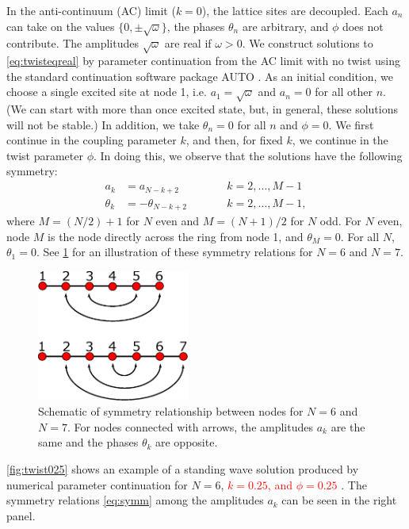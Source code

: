 \documentclass[reprint, amsmath,amssymb,aps,pra]{revtex4-2}
\def\noi{\noindent}
\renewcommand{\revised}[1]{ \textcolor{red}{#1} }
\begin{document}
In the anti-continuum (AC) limit ($k = 0$), the lattice sites are decoupled. Each $a_n$ can take on the values $\{0, \pm \sqrt{\omega} \}$, the phases $\theta_n$ are arbitrary, and $\phi$ does not contribute. The amplitudes $\sqrt{\omega}$ are real if  $\omega > 0$. We construct solutions to \cref{eq:twisteqreal} by parameter continuation from the AC limit with no twist using the standard continuation software package AUTO \revised{\cite{AUTO}}. As an initial condition, we choose a single excited site at node 1, i.e. $a_1 = \sqrt{\omega}$ and $a_n = 0$ for all other $n$. (We can start with more than once excited state, but, in general, these solutions will not be stable.) In addition, we take $\theta_n = 0$ for all $n$ and $\phi = 0$.  We first continue in the coupling parameter $k$, and then, for fixed $k$, we continue in the twist parameter $\phi$. In doing this, we observe that the solutions have the following symmetry:
\begin{equation}\label{eq:symm}
\begin{aligned}
a_k &= a_{N-k+2} && \qquad k = 2, \dots, M-1 \\
\theta_k &= -\theta_{N-k+2} && \qquad k = 2, \dots, M-1,
\end{aligned}
\end{equation}
where $M = (N/2)+1$ for $N$ even and $M = (N+1)/2$ for $N$ odd. For $N$ even, node $M$ is the node directly across the ring from node 1, and $\theta_M = 0$. For all $N$, $\theta_1 = 0$. See \cref{fig:symmetry1} for an illustration of these symmetry relations for $N = 6$ and $N = 7$. 
\begin{figure}
\begin{center}
\includegraphics[width=5cm]{symmetryvertical.eps}
\end{center}
\caption{Schematic of symmetry relationship between nodes for $N = 6$ and $N=7$. For nodes connected with arrows, the amplitudes $a_k$ are the same and the phases $\theta_k$ are opposite.}
\label{fig:symmetry1}
\end{figure}
\noi \cref{fig:twist025} shows an example of a standing wave solution produced by numerical parameter continuation for $N = 6$, \revised{$k = 0.25$, and $\phi = 0.25$}. The symmetry relations \cref{eq:symm} among the amplitudes $a_k$ can be seen in the right panel.
\end{document}
